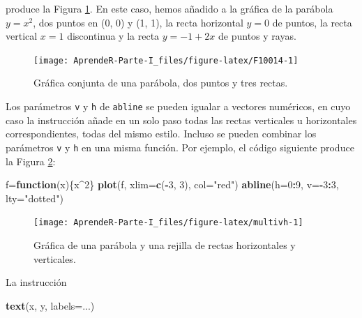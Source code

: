 \documentclass[]{book}
\newenvironment{Shaded}{\begin{snugshade}}{\end{snugshade}}
\newcommand{\ControlFlowTok}[1]{\textcolor[rgb]{0.13,0.29,0.53}{\textbf{#1}}}
\newcommand{\DataTypeTok}[1]{\textcolor[rgb]{0.13,0.29,0.53}{#1}}
\newcommand{\DecValTok}[1]{\textcolor[rgb]{0.00,0.00,0.81}{#1}}
\newcommand{\KeywordTok}[1]{\textcolor[rgb]{0.13,0.29,0.53}{\textbf{#1}}}
\newcommand{\NormalTok}[1]{#1}
\newcommand{\OperatorTok}[1]{\textcolor[rgb]{0.81,0.36,0.00}{\textbf{#1}}}
\newcommand{\StringTok}[1]{\textcolor[rgb]{0.31,0.60,0.02}{#1}}
\theoremstyle{definition}
\theoremstyle{definition}
\theoremstyle{definition}
\theoremstyle{remark}
\begin{document}
produce la Figura \ref{fig:F10014}. En este caso, hemos añadido a la gráfica de la parábola \(y=x^2\), dos puntos en (0, 0) y (1, 1), la recta horizontal \(y=0\) de puntos, la recta vertical \(x=1\) discontinua y la recta \(y=-1+2x\) de puntos y rayas.

\begin{figure}

{\centering \texttt{[image: AprendeR-Parte-I\_files/figure-latex/F10014-1]} 

}

\caption{Gráfica conjunta de una parábola, dos puntos y tres rectas.}\label{fig:F10014}
\end{figure}

Los parámetros \texttt{v} y \texttt{h} de \texttt{abline} se pueden igualar a vectores numéricos, en cuyo caso la instrucción añade en un solo paso todas las rectas verticales u horizontales correspondientes, todas del mismo estilo. Incluso se pueden combinar los parámetros \texttt{v} y \texttt{h} en una misma función. Por ejemplo, el código siguiente produce la Figura \ref{fig:multivh}:

\begin{Shaded}
\begin{Highlighting}[]
\NormalTok{f=}\ControlFlowTok{function}\NormalTok{(x)\{x}\OperatorTok{^}\DecValTok{2}\NormalTok{\}}
\KeywordTok{plot}\NormalTok{(f, }\DataTypeTok{xlim=}\KeywordTok{c}\NormalTok{(}\OperatorTok{-}\DecValTok{3}\NormalTok{, }\DecValTok{3}\NormalTok{), }\DataTypeTok{col=}\StringTok{"red"}\NormalTok{)}
\KeywordTok{abline}\NormalTok{(}\DataTypeTok{h=}\DecValTok{0}\OperatorTok{:}\DecValTok{9}\NormalTok{, }\DataTypeTok{v=}\OperatorTok{-}\DecValTok{3}\OperatorTok{:}\DecValTok{3}\NormalTok{, }\DataTypeTok{lty=}\StringTok{"dotted"}\NormalTok{)}
\end{Highlighting}
\end{Shaded}

\begin{figure}

{\centering \texttt{[image: AprendeR-Parte-I\_files/figure-latex/multivh-1]} 

}

\caption{Gráfica de una parábola y una rejilla de rectas horizontales y verticales.}\label{fig:multivh}
\end{figure}

La instrucción

\begin{Shaded}
\begin{Highlighting}[]
\KeywordTok{text}\NormalTok{(x, y, }\DataTypeTok{labels=}\NormalTok{...)}
\end{Highlighting}
\end{Shaded}
\end{document}

